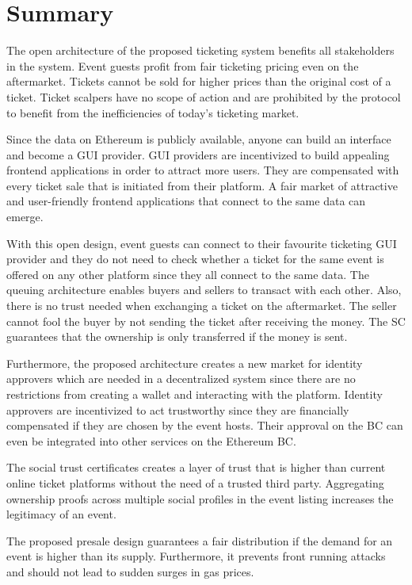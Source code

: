 \chapter{Summary}\label{chapter:summary}

The open architecture of the proposed ticketing system benefits all stakeholders in the system. Event guests profit from fair ticketing pricing even on the aftermarket. Tickets cannot be sold for higher prices than the original cost of a ticket. Ticket scalpers have no scope of action and are prohibited by the protocol to benefit from the inefficiencies of today's ticketing market.

Since the data on Ethereum is publicly available, anyone can build an interface and become a GUI provider. GUI providers are incentivized to build appealing frontend applications in order to attract more users. They are compensated with every ticket sale that is initiated from their platform. A fair market of attractive and user-friendly frontend applications that connect to the same data can emerge.

With this open design, event guests can connect to their favourite ticketing GUI provider and they do not need to check whether a ticket for the same event is offered on any other platform since they all connect to the same data. The queuing architecture enables buyers and sellers to transact with each other. Also, there is no trust needed when exchanging a ticket on the aftermarket. The seller cannot fool the buyer by not sending the ticket after receiving the money. The SC guarantees that the ownership is only transferred if the money is sent.

Furthermore, the proposed architecture creates a new market for identity approvers which are needed in a decentralized system since there are no restrictions from creating a wallet and interacting with the platform. Identity approvers are incentivized to act trustworthy since they are financially compensated if they are chosen by the event hosts. Their approval on the BC can even be integrated into other services on the Ethereum BC. 

The social trust certificates creates a layer of trust that is higher than current online ticket platforms without the need of a trusted third party. Aggregating ownership proofs across multiple social profiles in the event listing increases the legitimacy of an event. 

The proposed presale design guarantees a fair distribution if the demand for an event is higher than its supply. Furthermore, it prevents front running attacks and should not lead to sudden surges in gas prices.

